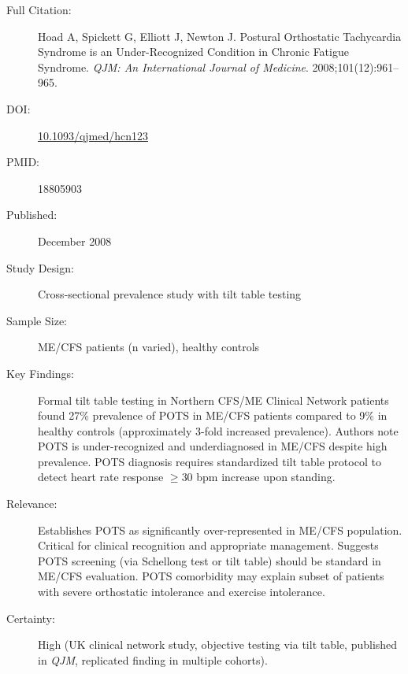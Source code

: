 \begin{description}
    \item[Full Citation:] Hoad A, Spickett G, Elliott J, Newton J. Postural Orthostatic Tachycardia Syndrome is an Under-Recognized Condition in Chronic Fatigue Syndrome. \textit{QJM: An International Journal of Medicine}. 2008;101(12):961--965.
    \item[DOI:] \href{https://doi.org/10.1093/qjmed/hcn123}{10.1093/qjmed/hcn123}
    \item[PMID:] 18805903
    \item[Published:] December 2008
    \item[Study Design:] Cross-sectional prevalence study with tilt table testing
    \item[Sample Size:] ME/CFS patients (n varied), healthy controls
    \item[Key Findings:] Formal tilt table testing in Northern CFS/ME Clinical Network patients found 27\% prevalence of POTS in ME/CFS patients compared to 9\% in healthy controls (approximately 3-fold increased prevalence). Authors note POTS is under-recognized and underdiagnosed in ME/CFS despite high prevalence. POTS diagnosis requires standardized tilt table protocol to detect heart rate response $\geq$30 bpm increase upon standing.
    \item[Relevance:] Establishes POTS as significantly over-represented in ME/CFS population. Critical for clinical recognition and appropriate management. Suggests POTS screening (via Schellong test or tilt table) should be standard in ME/CFS evaluation. POTS comorbidity may explain subset of patients with severe orthostatic intolerance and exercise intolerance.
    \item[Certainty:] High (UK clinical network study, objective testing via tilt table, published in \textit{QJM}, replicated finding in multiple cohorts).
\end{description}

